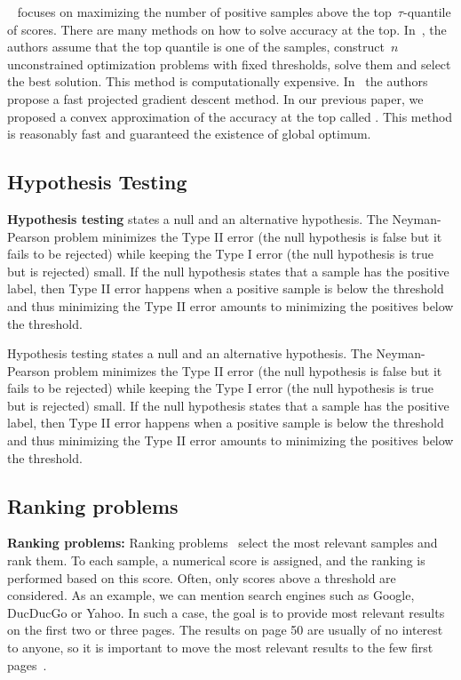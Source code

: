 \AccatTop~\cite{boyd2012accuracy} focuses on maximizing the number of positive samples above the top~$\tau$-quantile of scores. There are many methods on how to solve accuracy at the top. In~\cite{boyd2012accuracy}, the authors assume that the top quantile is one of the samples, construct~$n$ unconstrained optimization problems with fixed thresholds, solve them and select the best solution. This method is computationally expensive. In~\cite{grill2016learning} the authors propose a fast projected gradient descent method. In our previous paper, we proposed a convex approximation of the accuracy at the top called \PatMat. This method is reasonably fast and guaranteed the existence of global optimum.

\subsection{Hypothesis Testing}

\textbf{Hypothesis testing} states a null and an alternative hypothesis. The Neyman-Pearson problem minimizes the Type II error (the null hypothesis is false but it fails to be rejected) while keeping the Type I error (the null hypothesis is true but is rejected) small. If the null hypothesis states that a sample has the positive label, then Type II error happens when a positive sample is below the threshold and thus minimizing the Type II error amounts to minimizing the positives below the threshold.

Hypothesis testing states a null and an alternative hypothesis. The Neyman-Pearson problem minimizes the Type II error (the null hypothesis is false but it fails to be rejected) while keeping the Type I error (the null hypothesis is true but is rejected) small. If the null hypothesis states that a sample has the positive label, then Type II error happens when a positive sample is below the threshold and thus minimizing the Type II error amounts to minimizing the positives below the threshold.


\subsection{Ranking problems}

\textbf{Ranking problems:} Ranking problems~\cite{freund2003efficient, agarwal2011infinite, rudin2009pnorm, li2014top} select the most relevant samples and rank them. To each sample, a numerical score is assigned, and the ranking is performed based on this score. Often, only scores above a threshold are considered. As an example, we can mention search engines such as Google, DucDucGo or Yahoo. In such a case, the goal is to provide most relevant results on the first two or three pages. The results on page 50 are usually of no interest to anyone, so it is important to move the most relevant results to the few first pages~\cite{cortes2003auc}.



